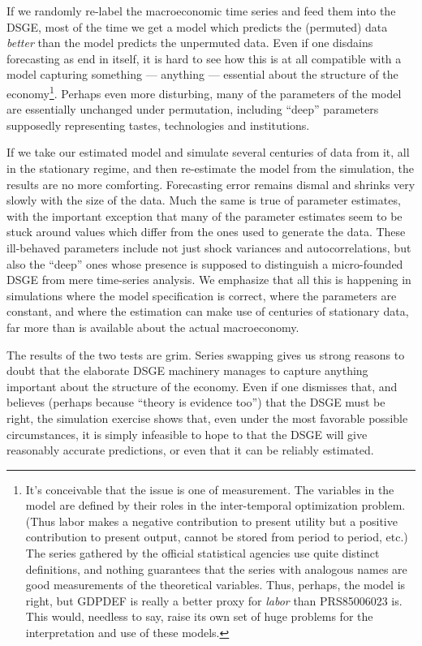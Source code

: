 \documentclass[11pt]{article}
\begin{document}
If we randomly re-label the macroeconomic time series and feed them into
the DSGE, most of the time we get a model which predicts the (permuted)
data \emph{better} than the model predicts the unpermuted data. Even if
one disdains forecasting as end in itself, it is hard to see how this is
at all compatible with a model capturing something --- anything ---
essential about the structure of the
economy\footnote{It's conceivable that the issue is one of measurement.
  The variables in the model are defined by their roles in the inter-temporal
  optimization problem.  (Thus labor makes a negative contribution to present
  utility but a positive contribution to present output, cannot be stored from
  period to period, etc.)  The series gathered by the official statistical
  agencies use quite distinct definitions, and nothing guarantees that the
  series with analogous names are good measurements of the theoretical
  variables.  Thus, perhaps, the model is right, but GDPDEF is really a better
  proxy for \emph{labor} than PRS85006023 is.  This would, needless to say,
  raise its own set of huge problems for the interpretation and use of these
  models.}. Perhaps even more disturbing, many of the parameters of the
model are essentially unchanged under permutation, including ``deep''
parameters supposedly representing tastes, technologies and
institutions.

If we take our estimated model and simulate several centuries of data
from it, all in the stationary regime, and then re-estimate the model
from the simulation, the results are no more comforting. Forecasting
error remains dismal and shrinks very slowly with the size of the data.
Much the same is true of parameter estimates, with the important
exception that many of the parameter estimates seem to be stuck around
values which differ from the ones used to generate the data. These
ill-behaved parameters include not just shock variances and
autocorrelations, but also the ``deep'' ones whose presence is supposed
to distinguish a micro-founded DSGE from mere time-series analysis. We
emphasize that all this is happening in simulations where the model
specification is correct, where the parameters are constant, and where
the estimation can make use of centuries of stationary data, far more
than is available about the actual macroeconomy.

The results of the two tests are grim. Series swapping gives us strong
reasons to doubt that the elaborate DSGE machinery manages to capture
anything important about the structure of the economy. Even if one
dismisses that, and believes (perhaps because ``theory is evidence
too'') that the DSGE must be right, the simulation exercise shows that,
even under the most favorable possible circumstances, it is simply
infeasible to hope to that the DSGE will give reasonably accurate
predictions, or even that it can be reliably estimated.
\end{document}
